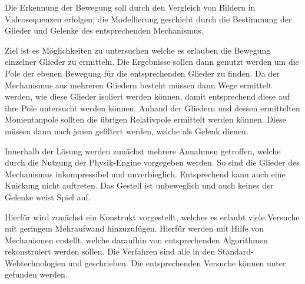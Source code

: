 Die Erkennung der Bewegung soll durch den Vergleich von Bildern in Videosequenzen erfolgen; die Modellierung geschieht durch die Bestimmung der Glieder und Gelenke des entsprechenden Mechanismus.

Ziel ist es Möglichkeiten zu untersuchen welche es erlauben die Bewegung einzelner Glieder zu ermitteln.
Die Ergebnisse sollen dann genutzt werden um die Pole der ebenen Bewegung für die entsprechenden Glieder zu finden.
Da der Mechanismus aus mehreren Gliedern besteht müssen dann Wege ermittelt werden, wie diese Glieder isoliert werden können, damit entsprechend diese auf ihre Pole untersucht werden können.
Anhand der Gliedern und dessen ermittelten Momentanpole sollten die übrigen Relativpole ermittelt werden können.
Diese müssen dann nach jenen gefiltert werden, welche als Gelenk dienen.

Innerhalb der Lösung werden zunächst mehrere Annahmen getroffen, welche durch die Nutzung der Physik-Engine  vorgegeben werden.
So sind die Glieder des Mechanismus inkompressibel und unverbieglich.
Entsprechend kann auch eine Knickung nicht auftreten.
Das Gestell ist unbeweglich und auch keines der Gelenke weist Spiel auf.

Hierfür wird zunächst ein Konstrukt vorgestellt, welches es erlaubt viele Versuche mit geringem Mehraufwand hinzuzufügen.
Hierfür werden mit Hilfe von  Mechanismen erstellt, welche daraufhin von entsprechenden Algorithmen rekonstruiert werden sollen.
Die Verfahren sind alle in den Standard-Webtechnologien  und  geschrieben.
Die entsprechenden Versuche können unter  gefunden werden.
